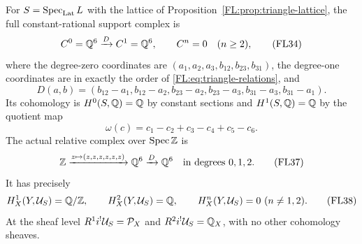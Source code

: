 \begin{theorem}
\label{FL:thm:triangle-cohomology}
For $S=\operatorname{Spec}_{\rm Lat} L$ with the lattice of
Proposition~\ref{FL:prop:triangle-lattice}, the full constant-rational
support complex is
\[
 C^0=\mathbb Q^6\xrightarrow{D}C^1=\mathbb Q^6,
 \qquad C^n=0\quad(n\ge2),
 \tag{FL34}\label{FL:eq:triangle-complex}
\]
where the degree-zero coordinates are
$(a_1,a_2,a_3,b_{12},b_{23},b_{31})$, the degree-one coordinates are
in exactly the order of \eqref{FL:eq:triangle-relations}, and
\[
 D(a,b)=(b_{12}-a_1,b_{12}-a_2,b_{23}-a_2,
                b_{23}-a_3,b_{31}-a_3,b_{31}-a_1).
 \tag{FL35}\label{FL:eq:triangle-differential}
\]
Its cohomology is $H^0(S,\mathbb Q)=\mathbb Q$ by constant sections and
$H^1(S,\mathbb Q)=\mathbb Q$ by the quotient map
\[
 \omega(c)=c_1-c_2+c_3-c_4+c_5-c_6.
 \tag{FL36}\label{FL:eq:cycle-functional}
\]
The actual relative complex over $\operatorname{Spec}\mathbb Z$ is
\[
 \mathbb Z\xrightarrow{z\mapsto(z,z,z,z,z,z)}\mathbb Q^6
 \xrightarrow{D}\mathbb Q^6
 \quad\text{in degrees }0,1,2.
 \tag{FL37}\label{FL:eq:triangle-relative-complex}
\]
It has precisely
\[
 H_X^1(Y,\mathcal U_S)=\mathbb Q/\mathbb Z,\qquad
 H_X^2(Y,\mathcal U_S)=\mathbb Q,
 \qquad H_X^n(Y,\mathcal U_S)=0\ (n\ne1,2).
 \tag{FL38}\label{FL:eq:triangle-relative-groups}
\]
At the sheaf level $R^1i^!\mathcal U_S=\mathcal P_X$ and
$R^2i^!\mathcal U_S=\mathbb Q_X$, with no other cohomology sheaves.
\end{theorem}
